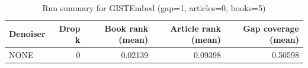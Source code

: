 \begin{table}
\caption{Run summary for GISTEmbed (gap=1, articles=0, books=5)}
\label{tab:summary_gap1_gistembed_a0_b5}
\begin{tabular}{lrrrr}
\toprule
Denoiser & Drop k & Book rank (mean) & Article rank (mean) & Gap coverage (mean) \\
\midrule
NONE & 0 & 0.02139 & 0.09398 & 0.50598 \\
\bottomrule
\end{tabular}
\end{table}